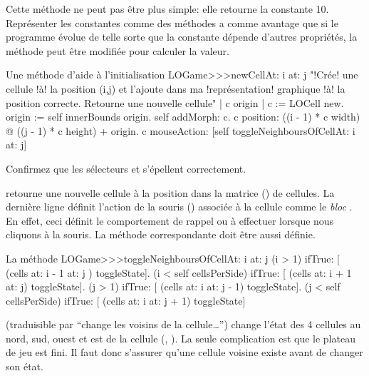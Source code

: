 \documentclass[a4paper,10pt,twoside]{book}
\begin{document}
Cette méthode ne peut pas être plus simple: elle retourne la constante
10. Représenter les constantes comme des méthodes a comme avantage que 
si le programme évolue de telle sorte que la constante dépende d'autres 
propriétés, la méthode peut être modifiée pour calculer la valeur.

\begin{method}[newCellAt:at:]{Une méthode d'aide à l'initialisation}
LOGame>>>newCellAt: i at: j
   "!Crée! une cellule !à! la position (i,j) et l'ajoute dans ma !représentation! graphique !à! la position correcte. Retourne une nouvelle cellule"
   | c origin |
   c := LOCell new.
   origin := self innerBounds origin.
   self addMorph: c.
   c position: ((i - 1) * c width) @ ((j - 1) * c height) + origin.
   c mouseAction: [self toggleNeighboursOfCellAt: i at: j]
\end{method}

Confirmez que les sélecteurs  et  s'épellent correctement.

 retourne une nouvelle cellule  à la position  dans la matrice () de cellules.
La dernière ligne définit l'action de la souris () associée à la cellule comme le \emph{bloc}
\mbox{.}
En effet, ceci définit le comportement de rappel ou \callback à effectuer lorsque nous cliquons à la souris.
La méthode correspondante doit être aussi définie.

\begin{method}[toggleNeighboursOfCellAt:at:]{La méthode \callback}
LOGame>>>toggleNeighboursOfCellAt: i at: j
   (i > 1) ifTrue: [ (cells at: i - 1 at: j ) toggleState].
   (i < self cellsPerSide) ifTrue: [ (cells at: i + 1 at: j) toggleState].
   (j > 1) ifTrue: [ (cells at: i  at: j - 1) toggleState].
   (j < self cellsPerSide) ifTrue: [ (cells at: i at: j + 1) toggleState]
\end{method}

 (traduisible par ``change les
voisins de la cellule\ldots'') change l'état des 4 cellules au nord, sud, ouest et est de la cellule (, ). La seule complication est que le plateau de jeu est fini. Il faut donc s'assurer qu'une cellule voisine existe avant de changer son état.
\end{document}
